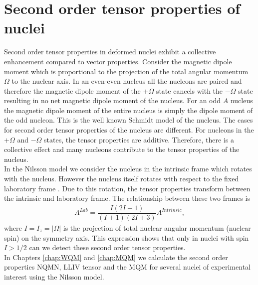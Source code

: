 \documentclass[10pt,a4paper, twoside, openright]{report}
\begin{document}
\section{Second order tensor properties of nuclei}
Second order tensor properties  in deformed nuclei exhibit a collective enhancement compared to vector properties. Consider the magnetic dipole moment  which is proportional to  the projection of the total angular momentum $\Omega$ to the nuclear axis. In an even-even nucleus all the nucleons are paired and therefore the magnetic dipole moment of the $+\Omega$ state cancels with the $-\Omega$ state resulting in no net magnetic dipole moment of the nucleus. For an odd $A$ nucleus  the magnetic dipole moment of the entire nucleus is simply the dipole moment of the odd nucleon. This is the well known Schmidt model of the nucleus. The cases for second order tensor properties of the nucleus are different. For nucleons in the  $+\Omega$ and $-\Omega$ states, the tensor properties  are additive. Therefore, there is a collective effect and many nucleons contribute to the tensor properties of the nucleus.\\
\linebreak
In the Nilsson model we consider the nucleus in the intrinsic frame which rotates with the nucleus. However the nucleus itself rotates with respect to the fixed laboratory frame \cite{BohrMottVol2}. Due to this rotation, the tensor properties transform between the intrinsic  and laboratory frame. The relationship between these two frames is \cite{BohrMottVol2}
\begin{align} \label{eq:RotationalFactor}
A^{Lab} = \dfrac{I\left(2I - 1\right)}{\left(I + 1 \right)\left(2I + 3\right)}A^{Intrinsic},
\end{align}
where $I=I_z= \left|\Omega\right|$ is the projection of total nuclear angular momentum (nuclear spin) on the symmetry axis. This expression shows that only in nuclei with spin $I > 1/2$ can we detect these second order tensor properties. \\
\linebreak
In Chapters \ref{chap:WQM} and \ref{chap:MQM} we calculate the second order properties NQMN, LLIV tensor and the MQM for several nuclei of experimental interest using the Nilsson model.
\end{document}

